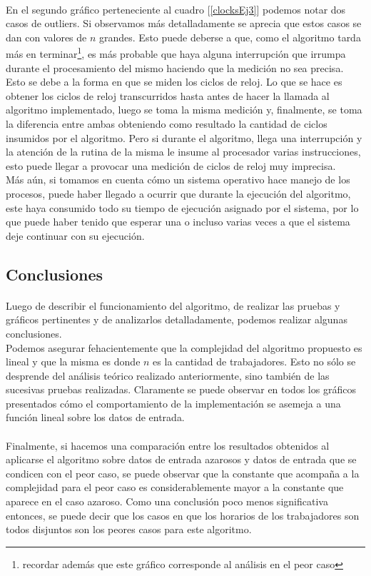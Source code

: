 \paragraph{}
En el segundo gráfico perteneciente al cuadro [\ref{clocksEj3}] podemos notar dos casos de outliers. Si observamos más detalladamente se aprecia que estos casos se dan con valores de $n$ grandes. Esto puede deberse a que, como el algoritmo tarda más en terminar\footnote{recordar además que este gráfico corresponde al análisis en el peor caso}, es más probable que haya alguna interrupción que irrumpa durante el procesamiento del mismo haciendo que la medición no sea precisa. Esto se debe a la forma en que se miden los ciclos de reloj. Lo que se hace es obtener los ciclos de reloj transcurridos hasta antes de hacer la llamada al algoritmo implementado, luego se toma la misma medición y, finalmente, se toma la diferencia entre ambas obteniendo como resultado la cantidad de ciclos insumidos por el algoritmo. Pero si durante el algoritmo, llega una interrupción y la atención de la rutina de la misma le insume al procesador varias instrucciones, esto puede llegar a provocar una medición de ciclos de reloj muy imprecisa.\\
Más aún, si tomamos en cuenta cómo un sistema operativo hace manejo de los procesos, puede haber llegado a ocurrir que durante la ejecución del algoritmo, este haya consumido todo su tiempo de ejecución asignado por el sistema, por lo que puede haber tenido que esperar una o incluso varias veces a que el sistema deje continuar con su ejecución.


\subsection{Conclusiones}
\paragraph{}
Luego de describir el funcionamiento del algoritmo, de realizar las pruebas y gráficos pertinentes y de analizarlos detalladamente, podemos realizar algunas conclusiones.\\
Podemos asegurar fehacientemente que la complejidad del algoritmo propuesto es lineal y que la misma es  donde $n$ es la cantidad de trabajadores. Esto no sólo se desprende del análisis teórico realizado anteriormente, sino también de las sucesivas pruebas realizadas. Claramente se puede observar en todos los gráficos presentados cómo el comportamiento de la implementación se asemeja a una función lineal sobre los datos de entrada.

\paragraph{}
Finalmente, si hacemos una comparación entre los resultados obtenidos al aplicarse el algoritmo sobre datos de entrada azarosos y datos de entrada que se condicen con el peor caso, se puede observar que la constante que acompaña a la complejidad para el peor caso es considerablemente mayor a la constante que aparece en el caso azaroso. Como una conclusión poco menos significativa entonces, se puede decir que los casos en que los horarios de los trabajadores son todos disjuntos son los peores casos para este algoritmo.